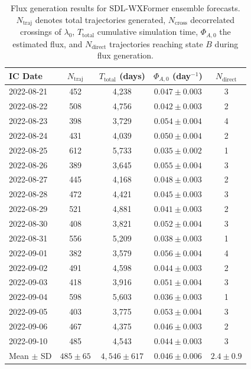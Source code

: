 \documentclass[11pt]{article}
\begin{document}
\begin{table}[htbp]
\centering
\caption{Flux generation results for SDL-WXFormer ensemble forecasts. $N_{\text{traj}}$ denotes total trajectories generated, $N_{\text{cross}}$ decorrelated crossings of $\lambda_0$, $T_{\text{total}}$ cumulative simulation time, $\Phi_{A,0}$ the estimated flux, and $N_{\text{direct}}$ trajectories reaching state $B$ during flux generation.}
\label{tab:flux_results}
\begin{tabular}{lcccc}
\toprule
IC Date & $N_{\text{traj}}$ & $T_{\text{total}}$ (days) & $\Phi_{A,0}$ (day$^{-1}$) & $N_{\text{direct}}$ \\
\midrule
2022-08-21 & 452 & 4,238 & $0.047 \pm 0.003$ & 3 \\
2022-08-22 & 508 & 4,756 & $0.042 \pm 0.003$ & 2 \\
2022-08-23 & 398 & 3,729 & $0.054 \pm 0.004$ & 4 \\
2022-08-24 & 431 & 4,039 & $0.050 \pm 0.004$ & 2 \\
2022-08-25 & 612 & 5,733 & $0.035 \pm 0.002$ & 1 \\
2022-08-26 & 389 & 3,645 & $0.055 \pm 0.004$ & 3 \\
2022-08-27 & 445 & 4,168 & $0.048 \pm 0.003$ & 2 \\
2022-08-28 & 472 & 4,421 & $0.045 \pm 0.003$ & 3 \\
2022-08-29 & 521 & 4,881 & $0.041 \pm 0.003$ & 2 \\
2022-08-30 & 408 & 3,821 & $0.052 \pm 0.004$ & 3 \\
2022-08-31 & 556 & 5,209 & $0.038 \pm 0.003$ & 1 \\
2022-09-01 & 382 & 3,579 & $0.056 \pm 0.004$ & 4 \\
2022-09-02 & 491 & 4,598 & $0.044 \pm 0.003$ & 2 \\
2022-09-03 & 418 & 3,916 & $0.051 \pm 0.004$ & 3 \\
2022-09-04 & 598 & 5,603 & $0.036 \pm 0.003$ & 1 \\
2022-09-05 & 403 & 3,775 & $0.053 \pm 0.004$ & 3 \\
2022-09-06 & 467 & 4,375 & $0.046 \pm 0.003$ & 2 \\
2022-09-10 & 485 & 4,543 & $0.044 \pm 0.003$ & 3 \\
\midrule
Mean $\pm$ SD & $485 \pm 65$ & $4{,}546 \pm 617$ & $0.046 \pm 0.006$ & $2.4 \pm 0.9$ \\
\bottomrule
\end{tabular}
\end{table}
\end{document}
